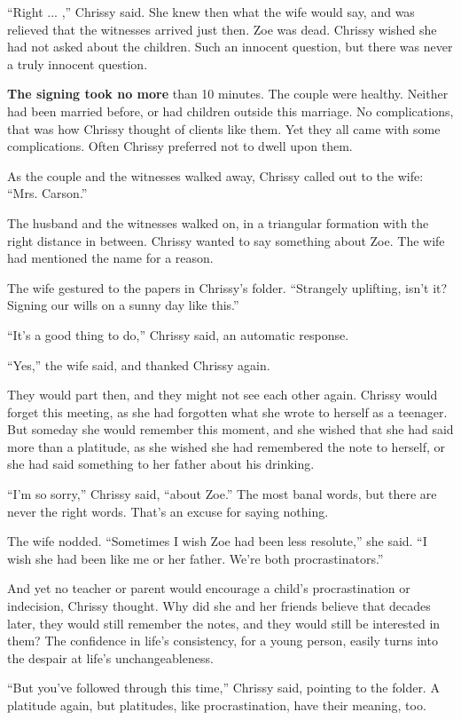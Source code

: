 ``Right ... ,'' Chrissy said. She knew then what the wife would say, and
was relieved that the witnesses arrived just then. Zoe was dead. Chrissy
wished she had not asked about the children. Such an innocent question,
but there was never a truly innocent question.

\textbf{The signing took no more} than 10 minutes. The couple were
healthy. Neither had been married before, or had children outside this
marriage. No complications, that was how Chrissy thought of clients like
them. Yet they all came with some complications. Often Chrissy preferred
not to dwell upon them.

As the couple and the witnesses walked away, Chrissy called out to the
wife: ``Mrs. Carson.''

The husband and the witnesses walked on, in a triangular formation with
the right distance in between. Chrissy wanted to say something about
Zoe. The wife had mentioned the name for a reason.

The wife gestured to the papers in Chrissy's folder. ``Strangely
uplifting, isn't it? Signing our wills on a sunny day like this.''

``It's a good thing to do,'' Chrissy said, an automatic response.

``Yes,'' the wife said, and thanked Chrissy again.

They would part then, and they might not see each other again. Chrissy
would forget this meeting, as she had forgotten what she wrote to
herself as a teenager. But someday she would remember this moment, and
she wished that she had said more than a platitude, as she wished she
had remembered the note to herself, or she had said something to her
father about his drinking.

``I'm so sorry,'' Chrissy said, ``about Zoe.'' The most banal words, but
there are never the right words. That's an excuse for saying nothing.

The wife nodded. ``Sometimes I wish Zoe had been less resolute,'' she
said. ``I wish she had been like me or her father. We're both
procrastinators.''

And yet no teacher or parent would encourage a child's procrastination
or indecision, Chrissy thought. Why did she and her friends believe that
decades later, they would still remember the notes, and they would still
be interested in them? The confidence in life's consistency, for a young
person, easily turns into the despair at life's unchangeableness.

``But you've followed through this time,'' Chrissy said, pointing to the
folder. A platitude again, but platitudes, like procrastination, have
their meaning, too.

